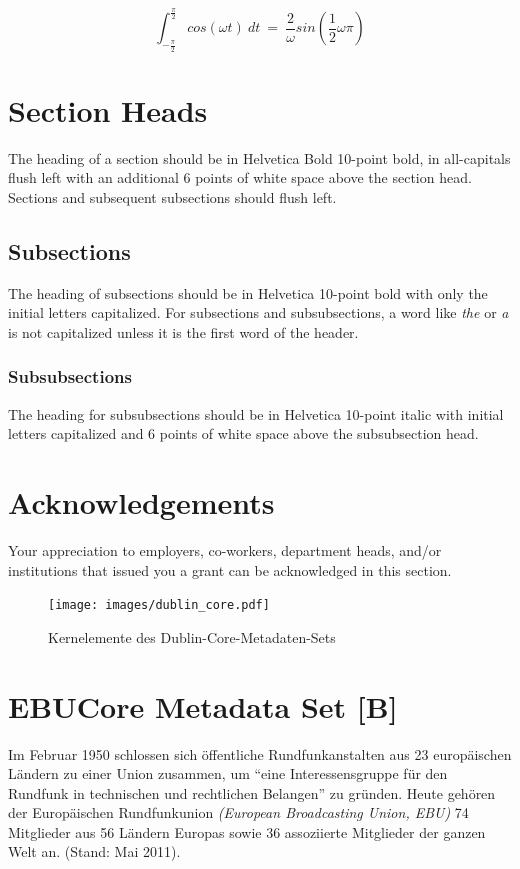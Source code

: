 	\begin{equation}
		\int_{- \frac{\pi}{2}}^{\frac{\pi}{2}}cos(\omega t)~dt
		~=~
		\frac{2}{\omega}sin( \frac{1}{2}\omega \pi)
		\label{myequation2}
	\end{equation}
	
	\section{Section Heads}
	The heading of a section should be in Helvetica Bold 10-point bold, in
	all-capitals flush left with an additional 6 points of white space above
	the section head. Sections and subsequent subsections should flush left.
	
	\subsection{Subsections}
	The heading of subsections should be in Helvetica 10-point bold with
	only the initial letters capitalized. For subsections and subsubsections,
	a word like \emph{the} or \emph{a} is not capitalized unless it is the
	first word of the header.
	
	\subsubsection{Subsubsections}
	The heading for subsubsections should be in Helvetica 10-point italic
	with initial letters capitalized and 6 points of white space above the
	subsubsection head.
	
	\section{Acknowledgements}
	Your appreciation to employers, co-workers, department heads, and/or
	institutions that issued you a grant can be acknowledged in this section.
	
	\begin{figure}[htbp]
		\texttt{[image: images/dublin\_core.pdf]}
		\caption{Kernelemente des Dublin-Core-Metadaten-Sets}
		\label{dublincore}
	\end{figure}
	
	\newpage
	
	
	\section{EBUCore Metadata Set [B]}
	Im Februar 1950 schlossen sich öffentliche Rundfunkanstalten aus 23 europäischen Ländern zu einer Union zusammen, um \enquote{eine Interessensgruppe für den Rundfunk in technischen und rechtlichen Belangen} zu gründen. Heute gehören der Europäischen Rundfunkunion \emph{(European Broadcasting Union, EBU)} 74 Mitglieder aus 56 Ländern Europas sowie 36 assoziierte Mitglieder der ganzen Welt an. (Stand: Mai 2011).

